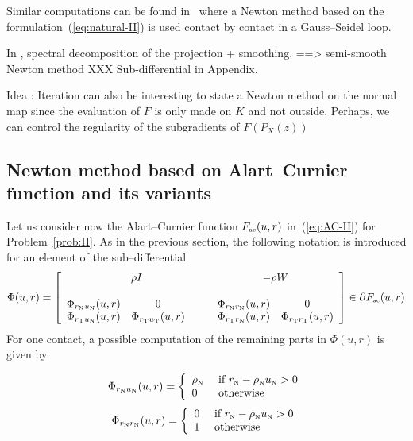 Similar computations can be found in~\cite{Joli.Feng2008} where a Newton method based on the formulation~(\ref{eq:natural-II}) is used contact by contact in a Gauss--Seidel loop.


In \cite{Hayashi.ea_SIOPT2005}, spectral decomposition of the projection + smoothing. ==> semi-smooth Newton method XXX Sub-differential in Appendix.

\begin{ndrva}
Idea :  Iteration can also be interesting to state a Newton method on the normal map since the evaluation of $F$ is only made on $K$ and not outside. Perhaps, we can control the regularity of the subgradients of $F(P_X(z))$
\end{ndrva}

\subsection{Newton method based on Alart--Curnier function and its variants}
\label{Sec:NSN-AC}
Let us consider now the Alart--Curnier function $F_{{\hbox{\tiny{ac}}}}(u,r)$ in~(\ref{eq:AC-II}) for Problem~\ref{prob:II}. As in the previous section, the following notation is introduced for an element of the sub--differential
\begin{equation}
  \label{eq:Phi-AC-II}
  \Phi(u, r)  = \left[
  \begin{array}{cccc}
    \multicolumn{2}{c}{\rho  I}  &  \multicolumn{2}{c}{- \rho W} \\ \\
     \Phi_{r_\n u_\n}(u,r) & 0\quad\quad&   \Phi_{r_\n r_\n}(u,r) & 0 \\ 
     \Phi_{r_\t u_\n}(u,r) & \Phi_{r_\t u_\t}(u,r) \quad\quad&   \Phi_{r_\t r_\n}(u,r) & \Phi_{r_\t r_\t}(u,r) 
  \end{array}\right] \in \partial F_{\actwo}(u,r)
\end{equation}
For one contact, a possible computation of the remaining parts in $\Phi(u, r)$  is given by

\begin{equation}
  \label{eq:Phi-AC-II-rnun}
   \Phi_{r_\n u_\n}(u,r) =  \left\{
   \begin{array}{ll}
     \rho_{\n} & \text{ if }  r_{\n} - \rho_{\n} u_{\n} > 0 \\
     0  & \text{ otherwise } 
    \end{array}\right.
\end{equation}
\begin{equation}
  \label{eq:Phi-AC-II-rnrn}
  \Phi_{r_\n r_\n}(u,r) = 
  \left\{
    \begin{array}{ll}
      0 & \text{ if }  r_{\n} - \rho_{\n} u_{\n} > 0 \\
      1  & \text{ otherwise } 
    \end{array}\right. 
\end{equation}

